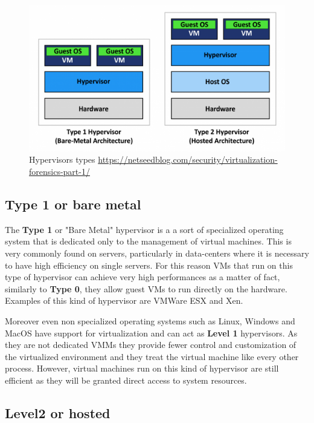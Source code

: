 \begin{figure}[htp]
\centering
\includegraphics[width=\linewidth]{images/hip.png}
\caption{Hypervisors types \newline \url{https://netseedblog.com/security/virtualization-forensics-part-1/}}
\label{fig:hip}
\end{figure}



\subsection{Type 1 or bare metal}

The \textbf{Type 1} or "Bare Metal" hypervisor is a a sort of specialized operating system that is dedicated only to the management of virtual machines. This is very commonly found on servers, particularly in data-centers where it is necessary to have high efficiency on single servers. For this reason VMs that run on this type of hypervisor can achieve very high performances as a matter of fact, similarly to \textbf{Type 0}, they allow guest VMs to run directly on the hardware. Examples of this kind of hypervisor are VMWare ESX and Xen.

Moreover even non specialized operating systems such as Linux, Windows and MacOS have support for virtualization and can act as \textbf{Level 1} hypervisors. As they are not dedicated VMMs they provide fewer control and customization of the virtualized environment and they treat the virtual machine like every other process. However, virtual machines run on this kind of hypervisor are still efficient as they will be granted direct access to system resources. 

\subsection{Level2 or hosted}

